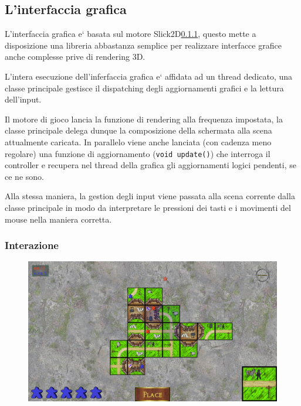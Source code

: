 \subsection{L'interfaccia grafica}
L'interfaccia grafica e` basata sul motore Slick2D\ref{}, %
questo mette a disposizione una libreria abbastanza semplice per realizzare interfacce grafice
anche complesse prive di rendering 3D.

L'intera esecuzione dell'inferfaccia grafica e` affidata ad un thread dedicato, una
classe principale gestisce il dispatching degli aggiornamenti grafici e la lettura
dell'input.

Il motore di gioco lancia la funzione di rendering alla frequenza impostata, la classe principale
delega dunque la composizione della schermata alla scena attualmente caricata.
In parallelo viene anche lanciata (con cadenza meno regolare) una funzione di aggiornamento (\texttt{void update()}) che interroga il controller e recupera nel thread della grafica gli aggiornamenti logici pendenti, se ce ne sono.

Alla stessa maniera, la gestion degli input viene passata alla scena corrente dalla classe principale in modo da interpretare le pressioni dei tasti e i movimenti del mouse nella maniera corretta.

\subsubsection{Interazione}
\begin{figure}
	\includegraphics[width=\textwidth]{img/effects.jpg}
\end{figure}

